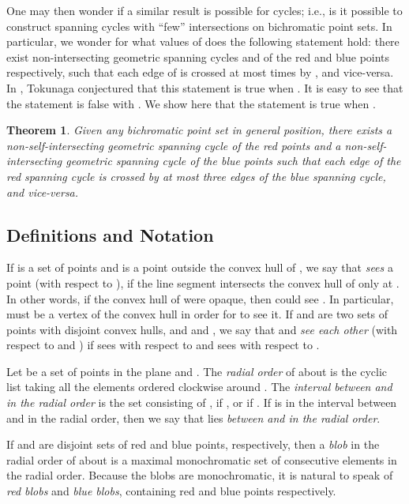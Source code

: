 \documentclass[12pt]{article}
\newtheorem{theorem}{Theorem}
\theoremstyle{definition}
\begin{document}
One may then wonder if a similar result is possible for cycles; i.e., is it possible to construct spanning cycles with ``few'' intersections on bichromatic point sets. In particular, we wonder for what values of  does the
following statement hold: there exist non-intersecting geometric spanning
cycles  and  of the red and blue points respectively, such that each
edge of  is crossed at most  times by , and vice-versa.
In \cite{tokunaga1996intersection}, Tokunaga conjectured that this statement is
true when .
It is easy to see that the statement is false with .
We show here that the statement is true when .

\begin{theorem}
\label{thm:main}
Given any bichromatic point set in general position, there exists a non-self-intersecting geometric spanning cycle of the red points and a
non-self-intersecting geometric spanning cycle of the blue points such that
each edge of the red spanning cycle is crossed by at most three edges of the blue spanning cycle, and vice-versa.
\end{theorem}

\subsection{Definitions and Notation}
If  is a set of points and  is a point outside the convex hull of , we say that  \emph{sees} a point  (with respect to ), if the line segment  intersects the convex hull of  only at .
In other words, if the convex hull of  were opaque, then  could see .
In particular,  must be a vertex of the convex hull in order for  to see it.
If  and  are two sets of points with disjoint convex hulls, and  and , we say that  and  \emph{see each other} (with respect to  and ) if  sees  with respect to  and  sees  with respect to .

Let  be a set of points in the plane and .
The \emph{radial order} of  about  is the cyclic  list  taking all the
elements  ordered clockwise around .
The \emph{interval between  and  in the radial order} is the set consisting of , if , or  if .
If  is in the interval between  and  in the radial order, then we say that  lies \emph{between  and  in the radial order}.

If  and  are disjoint sets of red and blue points, respectively, then a
\emph{blob} in the radial order of  about  is a maximal
monochromatic set of consecutive elements in the radial order.
Because the blobs are monochromatic, it is natural to speak of \emph{red blobs} and \emph{blue blobs}, containing red and blue points respectively.
\end{document}
